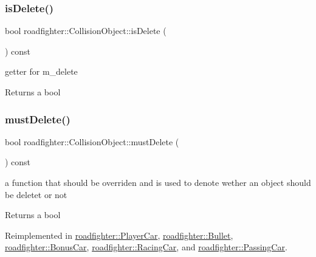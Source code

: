 \subsubsection{\texorpdfstring{is\+Delete()}{isDelete()}}
{\footnotesize\ttfamily bool roadfighter\+::\+Collision\+Object\+::is\+Delete (\begin{DoxyParamCaption}{ }\end{DoxyParamCaption}) const}

getter for m\+\_\+delete \begin{DoxyReturn}{Returns}
a bool 
\end{DoxyReturn}
\mbox{\label{classroadfighter_1_1CollisionObject_a738071cd7b1b8cd4c8d455b5e552bd4c}} 
\subsubsection{\texorpdfstring{must\+Delete()}{mustDelete()}}
{\footnotesize\ttfamily bool roadfighter\+::\+Collision\+Object\+::must\+Delete (\begin{DoxyParamCaption}{ }\end{DoxyParamCaption}) const\hspace{0.3cm}{\ttfamily [virtual]}}

a function that should be overriden and is used to denote wether an object should be deletet or not \begin{DoxyReturn}{Returns}
a bool 
\end{DoxyReturn}


Reimplemented in \hyperlink{classroadfighter_1_1PlayerCar_aaf4dc181a4d21e544aecd7a8e538cfd6}{roadfighter\+::\+Player\+Car}, \hyperlink{classroadfighter_1_1Bullet_a0f87b693a1583522e551ba1324fcd067}{roadfighter\+::\+Bullet}, \hyperlink{classroadfighter_1_1BonusCar_a19d01e92134634a82ae53f0d017956aa}{roadfighter\+::\+Bonus\+Car}, \hyperlink{classroadfighter_1_1RacingCar_a300bccb330cc8e84834edd5f85354a10}{roadfighter\+::\+Racing\+Car}, and \hyperlink{classroadfighter_1_1PassingCar_a96b365c19d4e6e940d3827319434a022}{roadfighter\+::\+Passing\+Car}.

\mbox{\label{classroadfighter_1_1CollisionObject_a880034efde5a30ccc98c2ff3a2dc7c84}} 
